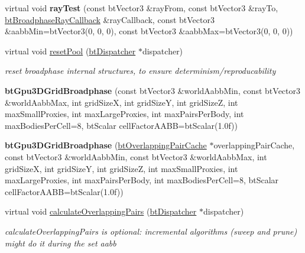 \begin{DoxyCompactItemize}
\item 
\mbox{\label{classbtGpu3DGridBroadphase_a56834601991a6ee9b12a691acdbd183b}} 
virtual void {\bfseries ray\+Test} (const bt\+Vector3 \&ray\+From, const bt\+Vector3 \&ray\+To, \hyperlink{structbtBroadphaseRayCallback}{bt\+Broadphase\+Ray\+Callback} \&ray\+Callback, const bt\+Vector3 \&aabb\+Min=bt\+Vector3(0, 0, 0), const bt\+Vector3 \&aabb\+Max=bt\+Vector3(0, 0, 0))
\item 
\mbox{\label{classbtGpu3DGridBroadphase_a2ba7288d1f24ee65d317fb36c3a4c1f1}} 
virtual void \hyperlink{classbtGpu3DGridBroadphase_a2ba7288d1f24ee65d317fb36c3a4c1f1}{reset\+Pool} (\hyperlink{classbtDispatcher}{bt\+Dispatcher} $\ast$dispatcher)
\begin{DoxyCompactList}\small\item\em reset broadphase internal structures, to ensure determinism/reproducability \end{DoxyCompactList}\item 
\mbox{\label{classbtGpu3DGridBroadphase_a16e59d6930a222fd5118611d4fccf0ba}} 
{\bfseries bt\+Gpu3\+D\+Grid\+Broadphase} (const bt\+Vector3 \&world\+Aabb\+Min, const bt\+Vector3 \&world\+Aabb\+Max, int grid\+SizeX, int grid\+SizeY, int grid\+SizeZ, int max\+Small\+Proxies, int max\+Large\+Proxies, int max\+Pairs\+Per\+Body, int max\+Bodies\+Per\+Cell=8, bt\+Scalar cell\+Factor\+A\+A\+BB=bt\+Scalar(1.\+0f))
\item 
\mbox{\label{classbtGpu3DGridBroadphase_a05fbb3eab41b49d68d270d2cf7d3fa00}} 
{\bfseries bt\+Gpu3\+D\+Grid\+Broadphase} (\hyperlink{classbtOverlappingPairCache}{bt\+Overlapping\+Pair\+Cache} $\ast$overlapping\+Pair\+Cache, const bt\+Vector3 \&world\+Aabb\+Min, const bt\+Vector3 \&world\+Aabb\+Max, int grid\+SizeX, int grid\+SizeY, int grid\+SizeZ, int max\+Small\+Proxies, int max\+Large\+Proxies, int max\+Pairs\+Per\+Body, int max\+Bodies\+Per\+Cell=8, bt\+Scalar cell\+Factor\+A\+A\+BB=bt\+Scalar(1.\+0f))
\item 
virtual void \hyperlink{classbtGpu3DGridBroadphase_ac59344854cc1f33ded7cdedd72c7a454}{calculate\+Overlapping\+Pairs} (\hyperlink{classbtDispatcher}{bt\+Dispatcher} $\ast$dispatcher)
\begin{DoxyCompactList}\small\item\em calculate\+Overlapping\+Pairs is optional\+: incremental algorithms (sweep and prune) might do it during the set aabb \end{DoxyCompactList}\item 

\end{DoxyCompactItemize}
